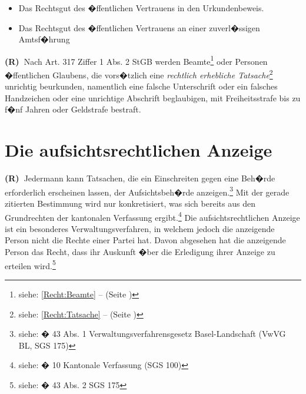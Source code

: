 \documentclass[paper=a4,fontsize=12pt, oneside, numbers=noenddot]{scrbook}
\newcounter{rz}
\newcommand{\Rz}{\addtocounter{rz}{1}\textbf{(R\arabic{rz})~}}
\begin{document}
	\begin{itemize}[noitemsep]\setlength\itemsep{0.3em}
		\item Das Rechtsgut des �ffentlichen Vertrauens in den Urkundenbeweis.
		\item Das Rechtsgut des �ffentlichen Vertrauens an einer zuverl�ssigen Amtsf�hrung
	\end{itemize} 
	
	\Rz Nach Art. 317 Ziffer 1 Abs. 2 StGB werden Beamte\footnote{siehe: \ref{Recht:Beamte} --  (Seite \pageref{Recht:Beamte})} oder Personen �ffentlichen Glaubens, die vors�tzlich eine \textit{rechtlich erhebliche Tatsache}\footnote{siehe: \ref{Recht:Tatsache} --  (Seite \pageref{Recht:Tatsache})} unrichtig beurkunden, namentlich eine falsche Unterschrift oder ein falsches Handzeichen oder eine unrichtige Abschrift beglaubigen, mit Freiheitsstrafe bis zu f�nf Jahren oder Geldstrafe bestraft.
	
	
	
	
	
	
	\section{Die aufsichtsrechtlichen Anzeige}\label{section:AufsichtsrechtlicheAnzeige}
	\Rz Jedermann kann Tatsachen, die ein Einschreiten gegen eine Beh�rde erforderlich erscheinen lassen, der Aufsichtsbeh�rde anzeigen.\footnote{siehe: � 43 Abs. 1 Verwaltungsverfahrensgesetz Basel-Landschaft (VwVG BL, SGS 175)} Mit der gerade zitierten Bestimmung wird nur konkretisiert, was sich bereits aus den Grundrechten der kantonalen Verfassung ergibt.\footnote{siehe: � 10 Kantonale Verfassung (SGS 100)} Die aufsichtsrechtlichen Anzeige ist ein besonderes Verwaltungsverfahren, in welchem jedoch die anzeigende Person nicht die Rechte einer Partei hat. Davon abgesehen hat die anzeigende Person das Recht, dass ihr Auskunft �ber die Erledigung ihrer Anzeige zu erteilen wird.\footnote{siehe: � 43 Abs. 2 SGS 175} 
	
	
	
\end{document}
